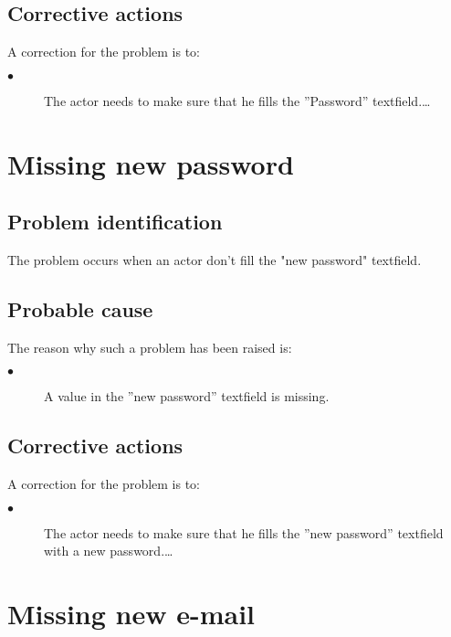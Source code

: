 \subsection{Corrective actions}

A correction for the problem is to:\\
\begin{description}
\item[$\bullet$] The actor needs to make sure that he fills the
''Password'' textfield.\ldots

\end{description}



\section{Missing new password} 

\subsection{Problem identification}
The problem occurs when an actor don't fill the "new password" textfield.

\subsection{Probable cause}

The reason why such a problem has been raised is:\\
\begin{description}
\item[$\bullet$] A value in the ''new password'' textfield is missing.
\end{description}


\subsection{Corrective actions}

A correction for the problem is to:\\
\begin{description}
\item[$\bullet$] The actor needs to make sure that he fills the
''new password'' textfield with a new password.\ldots

\end{description}




\section{Missing new e-mail} 

